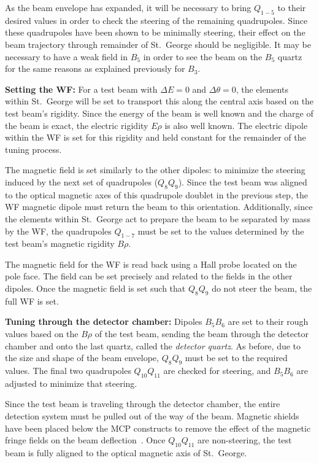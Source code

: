 As the beam envelope has expanded, it will be necessary to bring
$Q_{1-5}$ to their desired values in order to check the steering of the
remaining quadrupoles. Since these quadrupoles have been shown to be
minimally steering, their effect on the beam trajectory through
remainder of St.\ George should be negligible. It may be necessary to
have a weak field in $B_5$ in order to see the beam on the $B_5$ quartz
for the same reasons as explained previously for $B_3$.

\textbf{Setting the WF:}
For a test beam with $\Delta E = 0$ and $\Delta\theta = 0$, the elements
within St.\ George will be set to transport this along the central axis
based on the test beam's rigidity. Since the energy of the beam is well
known and the charge of the beam is exact, the electric rigidity $E\rho$
is also well known. The electric dipole within the WF is set for this
rigidity and held constant for the remainder of the tuning process.

The magnetic field is set similarly to the other dipoles: to minimize
the steering induced by the next set of quadrupoles ($Q_8Q_9$). Since
the test beam was aligned to the optical magnetic axes of this
quadrupole doublet in the previous step, the WF magnetic dipole must
return the beam to this orientation. Additionally, since the elements
within St.\ George act to prepare the beam to be separated by mass by
the WF, the quadrupoles $Q_{1-7}$ must be set to the values determined
by the test beam's magnetic rigidity $B\rho$.

The magnetic field for the WF is read back using a Hall probe located on
the pole face. The field can be set precisely and related to the fields
in the other dipoles. Once the magnetic field is set such that $Q_8Q_9$
do not steer the beam, the full WF is set.

\textbf{Tuning through the detector chamber:}
Dipoles $B_5B_6$ are set to their rough values based on the $B\rho$ of
the test beam, sending the beam through the detector chamber and onto
the last quartz, called the \emph{detector quartz}. As before, due to
the size and shape of the beam envelope, $Q_8Q_9$ must be set to the
required values. The final two quadrupoles $Q_{10}Q_{11}$ are checked
for steering, and $B_5B_6$ are adjusted to minimize that steering.

Since the test beam is traveling through the detector chamber, the
entire detection system must be pulled out of the way of the beam.
Magnetic shields have been placed below the MCP constructs to remove the
effect of the magnetic fringe fields on the beam
deflection~\cite{MoralesDNP}. Once $Q_{10}Q_{11}$ are non-steering, the
test beam is fully aligned to the optical magnetic axis of St.\ George.

